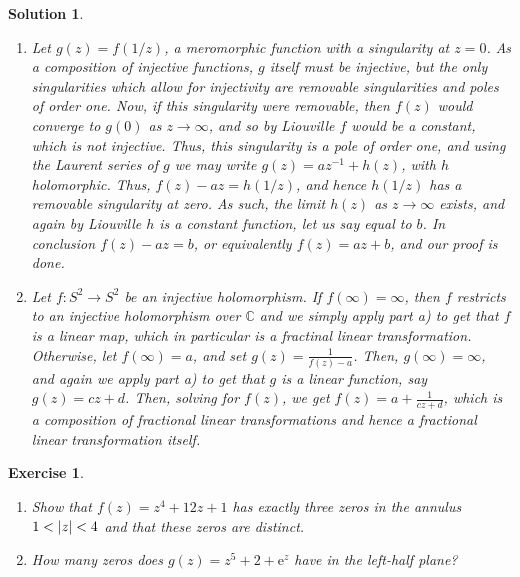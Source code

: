 \documentclass{article}
\newtheorem{ex}{Exercise}
\theoremstyle{nonumberplain}
\newtheorem{sol}{Solution}
\newcommand{\C}{\mathbb{C}}
\newcommand{\e}{\mathrm{e}}
\DeclarePairedDelimiter{\abs}{\lvert}{\rvert}
\begin{document}
\begin{sol}
\leavevmode
\begin{enumerate}
\item Let $g(z) = f(1/z)$, a meromorphic function with a singularity at $z = 0$. As a composition of injective functions, $g$ itself must be injective, but the only singularities which allow for injectivity are removable singularities and poles of order one. Now, if this singularity were removable, then $f(z)$ would converge to $g(0)$ as $z \to \infty$, and so by Liouville $f$ would be a constant, which is not injective. Thus, this singularity is a pole of order one, and using the Laurent series of $g$ we may write $g(z) = a z^{-1} + h(z)$, with $h$ holomorphic. Thus, $f(z) - a z = h(1/z)$, and hence $h(1/z)$ has a removable singularity at zero. As such, the limit $h(z)$ as $z \to \infty$ exists, and again by Liouville $h$ is a constant function, let us say equal to $b$. In conclusion $f(z) - a z = b$, or equivalently $f(z) = az + b$, and our proof is done.

\item Let $f \colon S^2 \to S^2$ be an injective holomorphism. If $f(\infty) = \infty$, then $f$ restricts to an injective holomorphism over $\C$ and we simply apply part a) to get that $f$ is a linear map, which in particular is a fractinal linear transformation. Otherwise, let $f(\infty) = a$, and set $g(z) = \frac1{f(z) - a}$. Then, $g(\infty) = \infty$, and again we apply part a) to get that $g$ is a linear function, say $g(z) = c z + d$. Then, solving for $f(z)$, we get $f(z) = a + \frac1{c z + d}$, which is a composition of fractional linear transformations and hence a fractional linear transformation itself.
\end{enumerate}
\end{sol}

\begin{ex}
\leavevmode
\begin{enumerate}
\item Show that $f(z) = z^4 + 12 z + 1$ has exactly three zeros in the annulus $1 < \abs z < 4$ and that these zeros are distinct.
\item How many zeros does $g(z) = z^5 + 2 + \e^z$ have in the left-half plane?
\end{enumerate}
\end{ex}
\end{document}
